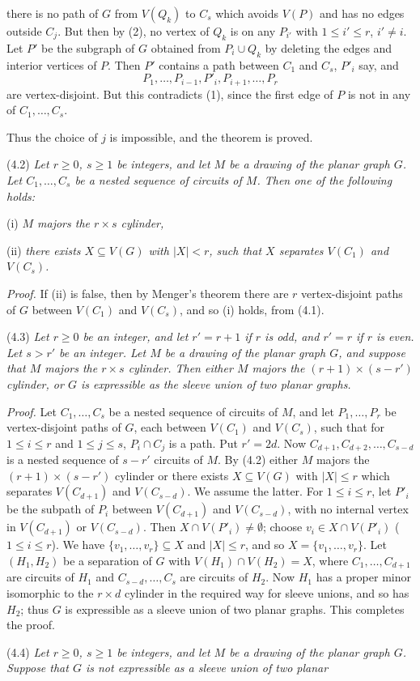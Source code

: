 \noindent there is no path of $G$ from $V(Q_k)$ to $C_s$ which avoids $V(P)$ and has no edges outside $C_j$. But then by (2), no vertex of $Q_k$ is on any $P_{i'}$ with $1 \le i' \le r$, $i' \ne i$. Let $P'$ be the subgraph of $G$ obtained from $P_i \cup Q_k$ by deleting the edges and interior vertices of $P$. Then $P'$ contains a path between $C_1$ and $C_s$, $P'_i$ say, and
\begin{equation*}
P_1, \dots, P_{i-1}, P'_i, P_{i+1}, \dots, P_r
\end{equation*}
are vertex-disjoint. But this contradicts (1), since the first edge of $P$ is not in any of $C_1, \dots, C_s$.

Thus the choice of $j$ is impossible, and the theorem is proved.

\stmt
(4.2) \textit{Let $r \ge 0$, $s \ge 1$ be integers, and let $M$ be a drawing of the planar graph $G$. Let $C_1, \dots, C_s$ be a nested sequence of circuits of $M$. Then one of the following holds:}

\hspace*{12pt}(i) \textit{$M$ majors the $r \times s$ cylinder,}

\hspace*{12pt}(ii) \textit{there exists $X \subseteq V(G)$ with $|X| < r$, such that $X$ separates $V(C_1)$ and $V(C_s)$.}

\textit{Proof.} If (ii) is false, then by Menger's theorem there are $r$ vertex-disjoint paths of $G$ between $V(C_1)$ and $V(C_s)$, and so (i) holds, from (4.1).

\stmt
(4.3) \textit{Let $r \ge 0$ be an integer, and let $r' = r + 1$ if $r$ is odd, and $r' = r$ if $r$ is even. Let $s > r'$ be an integer. Let $M$ be a drawing of the planar graph $G$, and suppose that $M$ majors the $r \times s$ cylinder. Then either $M$ majors the $(r + 1) \times (s - r')$ cylinder, or $G$ is expressible as the sleeve union of two planar graphs.}

\textit{Proof.} Let $C_1, \dots, C_s$ be a nested sequence of circuits of $M$, and let $P_1, \dots, P_r$ be vertex-disjoint paths of $G$, each between $V(C_1)$ and $V(C_s)$, such that for $1 \le i \le r$ and $1 \le j \le s$, $P_i \cap C_j$ is a path. Put $r' = 2d$. Now $C_{d+1}, C_{d+2}, \dots, C_{s-d}$ is a nested sequence of $s - r'$ circuits of $M$. By (4.2) either $M$ majors the $(r + 1) \times (s - r')$ cylinder or there exists $X \subseteq V(G)$ with $|X| \le r$ which separates $V(C_{d+1})$ and $V(C_{s-d})$. We assume the latter. For $1 \le i \le r$, let $P'_i$ be the subpath of $P_i$ between $V(C_{d+1})$ and $V(C_{s-d})$, with no internal vertex in $V(C_{d+1})$ or $V(C_{s-d})$. Then $X \cap V(P'_i) \ne \emptyset$; choose $v_i \in X \cap V(P'_i)$ ($1 \le i \le r$). We have $\{v_1, \dots, v_r\} \subseteq X$ and $|X| \le r$, and so $X = \{v_1, \dots, v_r\}$. Let $(H_1, H_2)$ be a separation of $G$ with $V(H_1) \cap V(H_2) = X$, where $C_1, \dots, C_{d+1}$ are circuits of $H_1$ and $C_{s-d}, \dots, C_s$ are circuits of $H_2$. Now $H_1$ has a proper minor isomorphic to the $r \times d$ cylinder in the required way for sleeve unions, and so has $H_2$; thus $G$ is expressible as a sleeve union of two planar graphs. This completes the proof.

\stmt
(4.4) \textit{Let $r \ge 0$, $s \ge 1$ be integers, and let $M$ be a drawing of the planar graph $G$. Suppose that $G$ is not expressible as a sleeve union of two planar}
